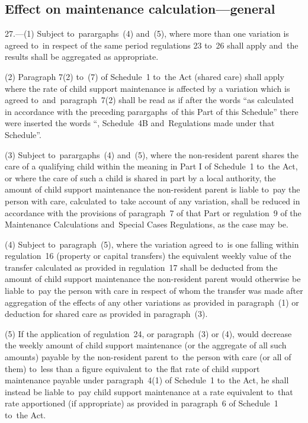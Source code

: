 \documentclass[12pt,a4paper]{article}
\begin{document}
\subsection[27. Effect on maintenance calculation—general]{Effect on maintenance calculation—general}

27.---(1)  Subject to~parargaphs~(4) and~(5), where more than one variation is agreed to~in respect of the same period regulations 23 to~26 shall apply and~the results shall be aggregated as appropriate.

(2) Paragraph 7(2) to~(7) of Schedule~1 to~the Act (shared care) shall apply where the rate of child support maintenance is affected by a variation which is agreed to~and~paragraph~7(2) shall be read as if after the words “as calculated in accordance with the preceding parargaphs~of this Part of this Schedule” there were inserted the words “, Schedule~4B and~Regulations made under that Schedule”.

(3) Subject to~parargaphs~(4) and~(5), where the non-resident parent shares the care of a qualifying child within the meaning in Part I of Schedule~1 to~the Act, or where the care of such a child is shared in part by a local authority, the amount of child support maintenance the non-resident parent is liable to~pay the person with care, calculated to~take account of any variation, shall be reduced in accordance with the provisions of paragraph~7 of that Part or regulation~9 of the Maintenance Calculations and~Special Cases Regulations, as the case may be.

(4) Subject to~paragraph~(5), where the variation agreed to~is one falling within regulation~16 (property or capital transfers) the equivalent weekly value of the transfer calculated as provided in regulation~17 shall be deducted from the amount of child support maintenance the non-resident parent would otherwise be liable to~pay the person with care in respect of whom the transfer was made after aggregation of the effects of any other variations as provided in paragraph~(1) or deduction for shared care as provided in paragraph~(3).

(5) If the application of regulation~24, or paragraph~(3) or (4), would decrease the weekly amount of child support maintenance (or the aggregate of all such amounts) payable by the non-resident parent to~the person with care (or all of them) to~less than a figure equivalent to~the flat rate of child support maintenance payable under 
paragraph~4(1)  %
of Schedule~1 to~the Act, he shall instead be liable to~pay child support maintenance at a rate equivalent to~that rate apportioned (if appropriate) as provided in paragraph~6 of Schedule~1 to~the Act.
\end{document}
